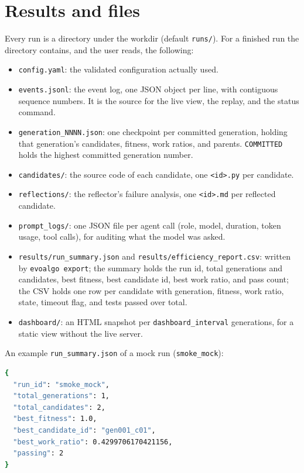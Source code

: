 \section{Results and files}
\label{sec:ud-results}

Every run is a directory under the workdir (default \texttt{runs/}). For a
finished run the directory contains, and the user reads, the following:

\begin{itemize}
  \item \texttt{config.yaml}: the validated configuration actually used.
  \item \texttt{events.jsonl}: the event log, one JSON object per line, with
  contiguous sequence numbers. It is the source for the live view, the replay,
  and the status command.
  \item \texttt{generation\_NNNN.json}: one checkpoint per committed
  generation, holding that generation's candidates, fitness, work ratios, and
  parents. \texttt{COMMITTED} holds the highest committed generation number.
  \item \texttt{candidates/}: the source code of each candidate, one
  \texttt{<id>.py} per candidate.
  \item \texttt{reflections/}: the reflector's failure analysis, one
  \texttt{<id>.md} per reflected candidate.
  \item \texttt{prompt\_logs/}: one JSON file per agent call (role, model,
  duration, token usage, tool calls), for auditing what the model was asked.
  \item \texttt{results/run\_summary.json} and
  \texttt{results/efficiency\_report.csv}: written by \texttt{evoalgo export};
  the summary holds the run id, total generations and candidates, best fitness,
  best candidate id, best work ratio, and pass count; the CSV holds one row per
  candidate with generation, fitness, work ratio, state, timeout flag, and
  tests passed over total.
  \item \texttt{dashboard/}: an HTML snapshot per \texttt{dashboard\_interval}
  generations, for a static view without the live server.
\end{itemize}

An example \texttt{run\_summary.json} of a mock run (\texttt{smoke\_mock}):

\begin{lstlisting}[language=bash, basicstyle=\ttfamily\small]
{
  "run_id": "smoke_mock",
  "total_generations": 1,
  "total_candidates": 2,
  "best_fitness": 1.0,
  "best_candidate_id": "gen001_c01",
  "best_work_ratio": 0.4299706170421156,
  "passing": 2
}
\end{lstlisting}

